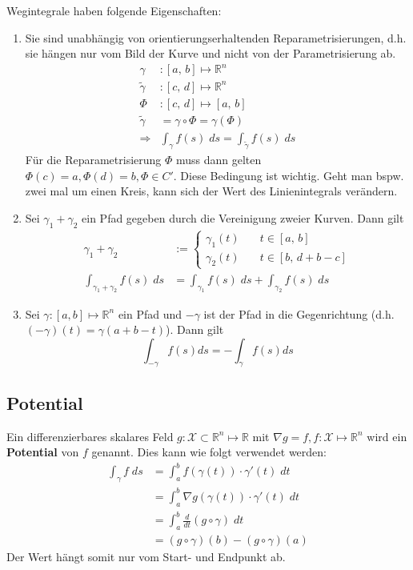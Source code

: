 \documentclass[a4paper,10pt]{article}
\def\R{\mathbb{R}}
\def\X{\mathcal{X}}
\begin{document}
Wegintegrale haben folgende Eigenschaften:
\begin{enumerate}
  \item Sie sind unabhängig von orientierungserhaltenden Reparametrisierungen, d.h. sie hängen nur vom Bild der Kurve und nicht von der Parametrisierung ab. 
  \begin{align*}
    \gamma&: [a,\, b] \mapsto \R^n\\
    \tilde{\gamma}&: [c,\, d] \mapsto \R^n\\
    \varPhi&: [c, \, d] \mapsto [a, \, b]\\
    \tilde{\gamma} &= \gamma \circ \varPhi = \gamma(\varPhi)\\
    \Rightarrow &\int_\gamma f(s) \; ds = \int_{\tilde{\gamma}} f(s) \; ds
  \end{align*}
  Für die Reparametrisierung $\varPhi$ muss dann gelten $\varPhi(c) = a, \varPhi(d) = b, \varPhi \in C'$. Diese Bedingung ist wichtig. Geht man bspw. zwei mal um einen Kreis, kann sich der Wert des Linienintegrals verändern.
  \item Sei \(\gamma_1 + \gamma_2\) ein Pfad gegeben durch die Vereinigung zweier Kurven. Dann gilt
  \begin{align*}
    \gamma_1 + \gamma_2 &:=
    \begin{cases}
      \gamma_1(t) \quad& t \in [a, \, b]\\
      \gamma_2(t) \quad& t \in [b, \, d + b - c]
    \end{cases}\\
    \int_{\gamma_1 + \gamma_2} f(s) \; ds &= \int_{\gamma_1} f(s) \; ds + \int_{\gamma_2} f(s)\; ds
  \end{align*}
  \item Sei \(\gamma : \left[a,b\right] \mapsto \R^n\) ein Pfad und \(-\gamma\) ist der Pfad in die Gegenrichtung (d.h. \((-\gamma)(t) = \gamma(a + b - t)\)). Dann gilt
  \[\int_{-\gamma} f(s)ds = -\int_\gamma f(s) ds\]
\end{enumerate}

\subsection{Potential}
Ein differenzierbares skalares Feld \(g: \X \subset \R^n \mapsto \R\) mit \(\nabla g = f, f: \X \mapsto \R^n\) wird ein \textbf{Potential} von \(f\) genannt. Dies kann wie folgt verwendet werden:
\begin{align*}
  \int_\gamma f \; ds &= \int_a^b f(\gamma(t)) \cdot \gamma'(t) \; dt\\
  &= \int_a^b \nabla g(\gamma(t)) \cdot \gamma'(t) \; dt\\
  &= \int_a^b \frac{d}{dt} (g \circ \gamma) \; dt\\
  &= (g \circ \gamma)(b) - (g \circ \gamma)(a)
\end{align*}
Der Wert hängt somit nur vom Start- und Endpunkt ab.
\end{document}

